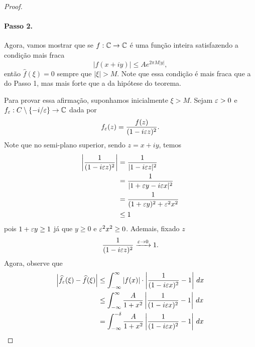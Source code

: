 \begin{proof}
            \paragraph{Passo 2.} Agora, vamos mostrar que se $f:\mathbb{C}\to\mathbb{C}$
            é uma função inteira satisfazendo a condição mais fraca
            \begin{equation*}
                |f(x+iy)| \leq Ae^{2\pi M|y|},
            \end{equation*}
            então $\widehat{f}(\xi) = 0$ sempre que $|\xi| > M$. Note
            que essa condição é mais fraca que a do Passo 1, mas mais
            forte que a da hipótese do teorema.
            
            Para provar essa afirmação, suponhamos inicialmente $\xi>M$.
            Sejam $\varepsilon>0$ e $f_{\varepsilon}:C\setminus\{-i/\varepsilon\}\to\mathbb{C}$ dada por
            \begin{equation*}
                f_{\varepsilon}(z) = \frac{f(z)}{(1 - i\varepsilon z)^2}.
            \end{equation*}
            Note que no semi-plano superior, sendo $z=x+iy$, temos
            \begin{align*}
                \left| \frac{1}{(1-i\varepsilon z)^2} \right| &= \frac{1}{|1-i\varepsilon z|^2} \\
                                                     &= \frac{1}{|1+\varepsilon y - i\varepsilon x|^2} \\
                                                     &= \frac{1}{(1+\varepsilon y)^2 + \varepsilon^2x^2} \\
                                                     &\leq 1
            \end{align*}
            pois $1+\varepsilon y \geq 1$ já que $y\geq 0$ e $\varepsilon^2x^2 \geq 0$. Ademais, fixado $z$
            \begin{equation*}
                \frac{1}{(1-i\varepsilon z)^2} \xrightarrow{\varepsilon \to 0} 1.
            \end{equation*}
            Agora, observe que
            \begin{align*}
                \left| \widehat{f_{\e}}(\xi) - \widehat{f}(\xi) \right| 
                &\leq \int_{-\infty}^{\infty} |f(x)|\cdot\left| \frac{1}{(1-i\e x)^2} - 1 \right| \, dx \\
                &\leq \int_{-\infty}^{\infty} \frac{A}{1+ x^2}\left| \frac{1}{(1-i\e x)^2} - 1 \right| \, dx \\
                &= \int_{-\infty}^{-\delta} \frac{A}{1+ x^2}\left| \frac{1}{(1-i\e x)^2} - 1 \right| \, dx \\

\end{align*}
\end{proof}
